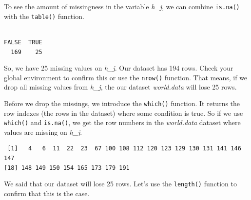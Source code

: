 \documentclass[]{article}
\newenvironment{Shaded}{\begin{snugshade}}{\end{snugshade}}
\newcommand{\KeywordTok}[1]{\textcolor[rgb]{0.13,0.29,0.53}{\textbf{#1}}}
\newcommand{\OperatorTok}[1]{\textcolor[rgb]{0.81,0.36,0.00}{\textbf{#1}}}
\newcommand{\NormalTok}[1]{#1}
\theoremstyle{definition}
\theoremstyle{definition}
\theoremstyle{definition}
\theoremstyle{remark}
\begin{document}
To see the amount of missingness in the variable \emph{h\_j}, we can
combine \texttt{is.na()} with the \texttt{table()} function.

\begin{Shaded}
\end{Shaded}

\begin{verbatim}

FALSE  TRUE 
  169    25 
\end{verbatim}

So, we have 25 missing values on \emph{h\_j}. Our dataset has 194 rows.
Check your global environment to confirm this or use the \texttt{nrow()}
function. That means, if we drop all missing values from \emph{h\_j},
the our dataset \emph{world.data} will lose 25 rows.

Before we drop the missings, we introduce the \texttt{which()} function.
It returns the row indexes (the rows in the dataset) where some
condition is true. So if we use \texttt{which()} and \texttt{is.na()},
we get the row numbers in the \emph{world.data} dataset where values are
missing on \emph{h\_j}.

\begin{Shaded}
\end{Shaded}

\begin{verbatim}
 [1]   4   6  11  22  23  67 100 108 112 120 123 129 130 131 141 146 147
[18] 148 149 150 154 165 173 179 191
\end{verbatim}

We said that our dataset will lose 25 rows. Let's use the
\texttt{length()} function to confirm that this is the case.

\begin{Shaded}
\end{Shaded}
\end{document}
